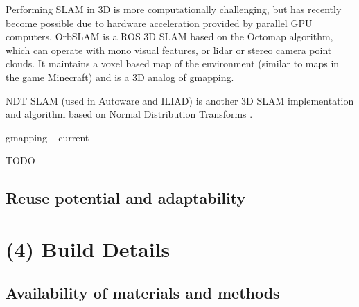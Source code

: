 \documentclass[a4paper]{article}
\begin{document}
Performing SLAM in 3D is more computationally challenging, but has recently become possible due to hardware acceleration provided by parallel GPU computers.
OrbSLAM is a ROS 3D SLAM based on the Octomap algorithm, which can operate with mono visual features, or lidar or stereo camera point clouds. It maintains a voxel based map of the environment (similar to maps in the game Minecraft) and is a 3D analog of gmapping.

NDT SLAM  (used in Autoware and ILIAD) is another 3D SLAM implementation and algorithm based on Normal Distribution Transforms \cite{einhorn2015generic}.

gmapping -- current

TODO



\subsection{Reuse potential and adaptability}\label{h.6wkumyl0ejrh}





\section{(4) Build Details}\label{h.l8i9vokvs0bj}

\subsection{Availability of materials and methods}\label{h.60suejv0jlzi}

\end{document}
